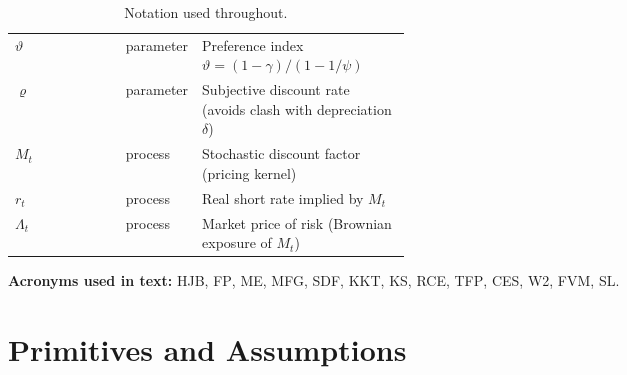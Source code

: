 ﻿\documentclass[11pt,letterpaper,oneside]{article}
\numberwithin{equation}{section}
\newcommand{\ac}[1]{{\mdseries\textsc{#1}}}
\newcommand{\printacronyms}{}
\newcommand{\1}{\mathbf{1}}
\begin{document}
\begin{table}[ht]
\begin{tabularx}{\linewidth}{@{} >{\raggedright\arraybackslash}p{0.28\linewidth} >{\raggedright\arraybackslash}p{0.18\linewidth} >{\raggedright\arraybackslash}X @{} }
$\vartheta$ & parameter & Preference index $\displaystyle \vartheta=(1-\gamma)/(1-1/\psi)$ \\
$\varrho$ & parameter & Subjective discount rate (avoids clash with depreciation $\delta$) \\
$M_t$ & process & Stochastic discount factor (pricing kernel) \\
$r_t$ & process & Real short rate implied by $M_t$ \\
$\Lambda_t$ & process & Market price of risk (Brownian exposure of $M_t$) \\
\bottomrule
\end{tabularx}
\endgroup
\caption{Notation used throughout.}
\end{table}

\medskip
\noindent\textbf{Acronyms used in text:} \ac{HJB}, \ac{FP}, \ac{ME}, \ac{MFG}, \ac{SDF}, \ac{KKT}, \ac{KS}, \ac{RCE}, \ac{TFP}, \ac{CES}, \ac{W2}, \ac{FVM}, \ac{SL}.
\medskip

\printacronyms

\section{Primitives and Assumptions}
\end{document}
